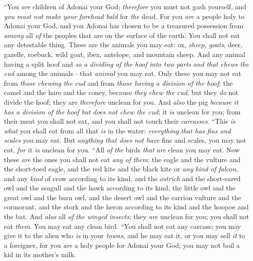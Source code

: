 \begin{biblechapter} %
\verse “You \textit{are} children of Adonai your God; \textit{therefore} you must not gash yourself, and \textit{you must not make your forehead bald} for \textit{the} dead.
\verse For you \textit{are} a people holy to Adonai your God, and you Adonai has chosen to be a treasured possession from \textit{among} all \textit{of} the peoples that are on the surface of the earth.
\verse You shall not eat any detestable thing.
\verse These are the animals you may eat: ox, \textit{sheep, goats},
\verse deer, gazelle, roebuck, wild goat, ibex, antelope, and mountain sheep.
\verse And any animal having a split hoof and \textit{so} \textit{a dividing of the hoof into two parts} \textit{and that chews the cud} among the animals—that \textit{animal} you may eat.
\verse Only these you may not eat from \textit{those chewing the cud} and from \textit{those having a division of the hoof}: the camel and the hare and the coney, because \textit{they chew the cud}, but they \textit{do} not divide the hoof; they are \textit{therefore} unclean for you.
\verse And \textit{also} the pig \textit{because it has a division of the hoof} \textit{but does not chew the cud}; it \textit{is} unclean for you; from their meat you shall not eat, and you shall not touch their \textit{carcasses}.
\verse “This \textit{is what} you shall eat from all that \textit{is} in the water: \textit{everything} \textit{that has fins and scales} you may eat.
\verse But \textit{anything that does not have} fins and scales, you may not eat, \textit{for} it \textit{is} unclean for you.
\verse “All \textit{of} \textit{the} birds \textit{that} \textit{are} clean you may eat.
\verse Now these \textit{are} the ones you shall not eat \textit{any of them}: the eagle and the vulture and the short-toed eagle,
\verse and the red kite and the black kite or \textit{any kind of falcon},
\verse and any \textit{kind} of crow according to its kind,
\verse and the \textit{ostrich} and the short-eared owl and the seagull and the hawk according to its kind,
\verse the little owl and the great owl and the barn owl,
\verse and the desert owl and the carrion vulture and the cormorant,
\verse and the stork and the heron according to its kind and the hoopoe and the bat.
\verse And \textit{also} all \textit{of} \textit{the winged insects}; they \textit{are} unclean for you; you shall not eat \textit{them}.
\verse You may eat any clean bird.
\verse “You shall not eat any carcass; you may give it to the alien who \textit{is} in your \textit{towns}, and he may eat it, or you may sell \textit{it} to a foreigner, for you \textit{are} a holy people for Adonai your God; you may not boil a kid in its mother’s milk.

\end{biblechapter}
